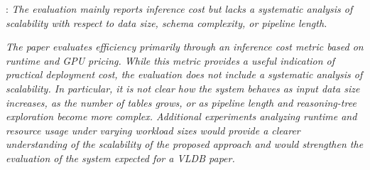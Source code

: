 

\begin{shaded}
{
: 
\emph{The evaluation mainly reports inference cost but lacks a systematic analysis of scalability with respect to data size, schema complexity, or pipeline length.
}

\emph{The paper evaluates efficiency primarily through an inference cost metric based on runtime and GPU pricing. While this metric provides a useful indication of practical deployment cost, the evaluation does not include a systematic analysis of scalability.
In particular, it is not clear how the system behaves as input data size increases, as the number of tables grows, or as pipeline length and reasoning-tree exploration become more complex. Additional experiments analyzing runtime and resource usage under varying workload sizes would provide a clearer understanding of the scalability of the proposed approach and would strengthen the evaluation of the system expected for a VLDB paper.}
}
\end{shaded}



